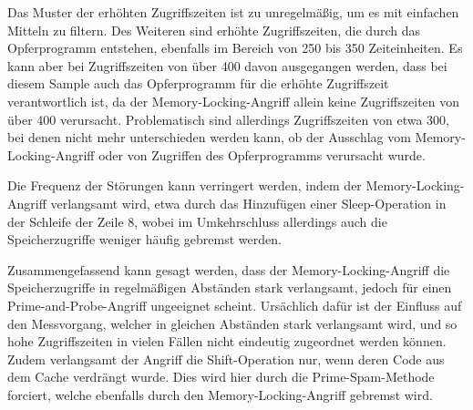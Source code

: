 Das Muster der erhöhten Zugriffszeiten ist zu unregelmäßig, um es mit einfachen Mitteln zu filtern.
Des Weiteren sind erhöhte Zugriffszeiten, die durch das Opferprogramm entstehen, ebenfalls im Bereich von 250 bis 350 Zeiteinheiten.
Es kann aber bei Zugriffszeiten von über 400 davon ausgegangen werden, dass bei diesem Sample auch das Opferprogramm für die erhöhte Zugriffszeit verantwortlich ist, da der Memory-Locking-Angriff allein keine Zugriffszeiten von über 400 verursacht.
Problematisch sind allerdings Zugriffszeiten von etwa 300, bei denen nicht mehr unterschieden werden kann, ob der Ausschlag vom Memory-Locking-Angriff oder von Zugriffen des Opferprogramms verursacht wurde.

Die Frequenz der Störungen kann verringert werden, indem der Memory-Locking-Angriff verlangsamt wird, etwa durch das Hinzufügen einer Sleep-Operation in der Schleife der Zeile 8, wobei im Umkehrschluss allerdings auch die Speicherzugriffe weniger häufig gebremst werden.

Zusammengefassend kann gesagt werden, dass der Memory-Locking-Angriff die Speicherzugriffe in regelmäßigen Abständen stark verlangsamt, jedoch für einen Prime-and-Probe-Angriff ungeeignet scheint.
Ursächlich dafür ist der Einfluss auf den Messvorgang, welcher in gleichen Abständen stark verlangsamt wird, und so hohe Zugriffszeiten in vielen Fällen nicht eindeutig zugeordnet werden können.
Zudem verlangsamt der Angriff die Shift-Operation nur, wenn deren Code aus dem Cache verdrängt wurde.
Dies wird hier durch die Prime-Spam-Methode forciert, welche ebenfalls durch den Memory-Locking-Angriff gebremst wird.








